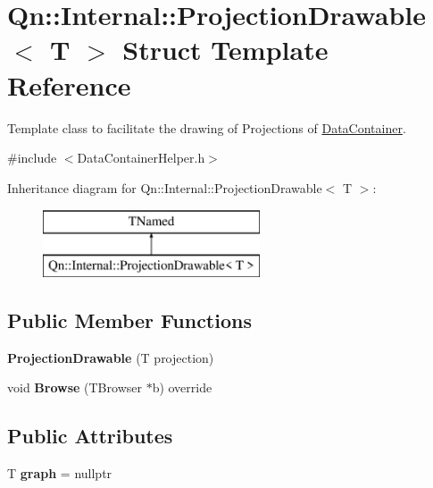 \hypertarget{structQn_1_1Internal_1_1ProjectionDrawable}{}\section{Qn\+:\+:Internal\+:\+:Projection\+Drawable$<$ T $>$ Struct Template Reference}
\label{structQn_1_1Internal_1_1ProjectionDrawable}


Template class to facilitate the drawing of Projections of \mbox{\hyperlink{classQn_1_1DataContainer}{Data\+Container}}.  




{\ttfamily \#include $<$Data\+Container\+Helper.\+h$>$}

Inheritance diagram for Qn\+:\+:Internal\+:\+:Projection\+Drawable$<$ T $>$\+:\begin{figure}[H]
\begin{center}
\leavevmode
\includegraphics[height=2.000000cm]{structQn_1_1Internal_1_1ProjectionDrawable}
\end{center}
\end{figure}
\subsection*{Public Member Functions}
\begin{DoxyCompactItemize}
\item 
\mbox{\label{structQn_1_1Internal_1_1ProjectionDrawable_a692fe39c9a74d689cc4679a190559805}} 
{\bfseries Projection\+Drawable} (T projection)
\item 
\mbox{\label{structQn_1_1Internal_1_1ProjectionDrawable_adb1b914219cad6cd49e8a35e8781be4a}} 
void {\bfseries Browse} (T\+Browser $\ast$b) override
\end{DoxyCompactItemize}
\subsection*{Public Attributes}
\begin{DoxyCompactItemize}
\item 
\mbox{\label{structQn_1_1Internal_1_1ProjectionDrawable_aef9fa3539e77e695d40c658048e1faf4}} 
T {\bfseries graph} = nullptr
\end{DoxyCompactItemize}


